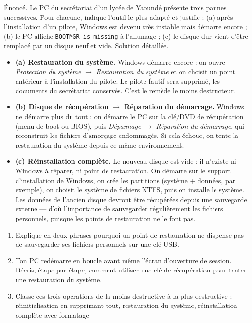 \documentclass[11pt]{article}
\begin{document}
\begin{exoresolu}
Énoncé. Le PC du secrétariat d'un lycée de Yaoundé présente trois pannes successives. Pour chacune, indique l'outil le plus adapté et justifie : (a) après l'installation d'un pilote, Windows est devenu très instable mais démarre encore ; (b) le PC affiche \texttt{BOOTMGR is missing} à l'allumage ; (c) le disque dur vient d'être remplacé par un disque neuf et vide.
\tcblower
Solution détaillée.
\begin{itemize}
\item \textbf{(a) Restauration du système.} Windows démarre encore : on ouvre \emph{Protection du système} $\rightarrow$ \emph{Restauration du système} et on choisit un point antérieur à l'installation du pilote. Le pilote fautif sera supprimé, les documents du secrétariat conservés. C'est le remède le moins destructeur.
\item \textbf{(b) Disque de récupération $\rightarrow$ Réparation du démarrage.} Windows ne démarre plus du tout : on démarre le PC sur la clé/DVD de récupération (menu de boot ou BIOS), puis \emph{Dépannage} $\rightarrow$ \emph{Réparation du démarrage}, qui reconstruit les fichiers d'amorçage endommagés. Si cela échoue, on tente la restauration du système depuis ce même environnement.
\item \textbf{(c) Réinstallation complète.} Le nouveau disque est vide : il n'existe ni Windows à réparer, ni point de restauration. On démarre sur le support d'installation de Windows, on crée les partitions (système + données, par exemple), on choisit le système de fichiers NTFS, puis on installe le système. Les données de l'ancien disque devront être récupérées depuis une sauvegarde externe — d'où l'importance de sauvegarder régulièrement les fichiers personnels, puisque les points de restauration ne le font pas.
\end{itemize}
\end{exoresolu}

\begin{exercice}
\begin{enumerate}
\item Explique en deux phrases pourquoi un point de restauration ne dispense pas de sauvegarder ses fichiers personnels sur une clé USB.
\item Ton PC redémarre en boucle avant même l'écran d'ouverture de session. Décris, étape par étape, comment utiliser une clé de récupération pour tenter une restauration du système.
\item Classe ces trois opérations de la moins destructive à la plus destructive : réinitialisation en supprimant tout, restauration du système, réinstallation complète avec formatage.
\end{enumerate}
\end{exercice}
\end{document}
